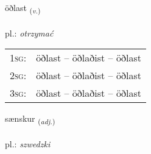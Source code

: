 \documentclass[frontgrid, backgrid]{flacards}\usepackage[]{graphicx}\usepackage[]{xcolor}
\begin{document}
\renewcommand{\flhead}{\vskip5pt \fboxsep=0pt {\small\bfseries\footnotesize Sagnorð | Verb}}
\renewcommand{\fcfoot}{\vskip5pt \fboxsep=0pt \hspace{2pt}{\small\bfseries\footnotesize 2K}}

\renewcommand{\blhead}{\vskip5pt {\small\bfseries\footnotesize Sagnorð | Verb }}
\renewcommand{\bcfoot}{\vskip5pt \hspace{2pt}{\small\bfseries\footnotesize 2K}}


{öðlast \small{\textsubscript{(\textit{v.})}} \\[1ex] %
\textphonetic{[œðlast]} \\
pl.: \emph{otrzymać} \\  [2ex]
\renewcommand*{\arraystretch}{0.8}
\begin{tabular}{p{1cm}l}
\textsc{1sg}: & öðlast -- öðlaðist -- öðlast \\ 
\textsc{2sg}: & öðlast -- öðlaðist -- öðlast \\ 
\textsc{3sg}: & öðlast -- öðlaðist -- öðlast \\ 
\end{tabular}
}

\renewcommand{\flhead}{\vskip5pt \fboxsep=0pt {\small\bfseries\footnotesize Lýsingarorð | Adjective}}
\renewcommand{\fcfoot}{\vskip5pt \fboxsep=0pt \hspace{2pt}{\small\bfseries\footnotesize 2K}}

\renewcommand{\blhead}{\vskip5pt {\small\bfseries\footnotesize Lýsingarorð | Adjective }}
\renewcommand{\bcfoot}{\vskip5pt \hspace{2pt}{\small\bfseries\footnotesize 2K}}


{sænskur \small{\textsubscript{(\textit{adj.})}} \\[1ex] %
\textphonetic{[sainskʏr]} \\
pl.: \emph{szwedzki} \\  [2ex]
\renewcommand*{\arraystretch}{0.8}
}
\end{document}
